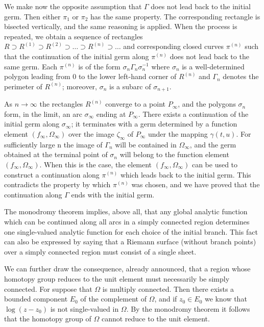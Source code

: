 We make now the opposite assumption that $\Gamma$ does not lead back to the initial germ. Then either $\pi_1$ or $\pi_2$ has the same property. The corresponding rectangle is bisected vertically, and the same reasoning is applied. When the process is repeated, we obtain a sequence of rectangles $R\supset R^{(1)}\supset R^{(2)}\supset \dots \supset R^{(n)}\supset \dots$ and corresponding closed curves $\pi^{(n)}$ such that the continuation of the initial germ along $\pi^{(n)}$ does not lead back to the same germ. Each $\pi^{(n)}$ is of the form $\sigma_n\Gamma_n\sigma_n^{-1}$ where $\sigma_n$ is a well-determined polygon leading from 0 to the lower left-hand corner of $R^{(n)}$ and $\Gamma_n$ denotes the perimeter of $R^{(n)}$; moreover, $\sigma_n$ is a subarc of $\sigma_{n+1}$.

As $n \to \infty$ the rectangles $R^{(n)}$ converge to a point $P_{\infty}$, and the polygons $\sigma_{n}$ form, in the limit, an arc $\sigma_{\infty}$ ending at $P_{\infty}$. There exists a continuation of the initial germ along $\sigma_{\infty}$; it terminates with a germ determined by a function element $(f_{\infty}, \Omega_{\infty})$ over the image $\zeta_{\infty}$ of $P_{\infty}$ under the mapping $\gamma(t, u)$. For sufficiently large n the image of $\Gamma_{n}$ will be contained in $\Omega_{\infty}$, and the germ obtained at the terminal point of $\sigma_{n}$ will belong to the function element $(f_{\infty}, \Omega_{\infty})$. When this is the case, the element $(f_{\infty}, \Omega_{\infty})$ can be used to construct a continuation along $\pi^{(n)}$ which leads back to the initial germ. This contradicts the property by which $\pi^{(n)}$ was chosen, and we have proved that the continuation along $\Gamma$ ends with the initial germ.

The monodromy theorem implies, above all, that any global analytic function which can be continued along all arcs in a simply connected region determines one single-valued analytic function for each choice of the initial branch. This fact can also be expressed by saying that a Riemann surface (without branch points) over a simply connected region must consist of a single sheet.

We can further draw the consequence, already announced, that a region whose homotopy group reduces to the unit element must necessarily be simply connected. For suppose that $\Omega$ is multiply connected. Then there exists a bounded component $E_{0}$ of the complement of $\Omega$, and
if $z_{0} \in E_{0}$ we know that $\log (z - z_{0})$ is not single-valued in $\Omega$. By the monodromy theorem it follows that the homotopy group of $\Omega$ cannot reduce to the unit element.

